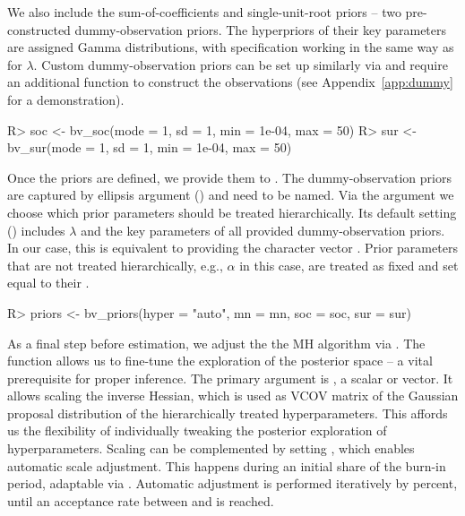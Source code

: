 \documentclass[article,nojss]{jss} %
\begin{document}
We also include the sum-of-coefficients and single-unit-root priors -- two pre-constructed dummy-observation priors. The hyperpriors of their key parameters are assigned Gamma distributions, with specification working in the same way as for $\lambda$. Custom dummy-observation priors can be set up similarly via  and require an additional function to construct the observations (see Appendix~\ref{app:dummy} for a demonstration).

\begin{Schunk}
\begin{Sinput}
R> soc <- bv_soc(mode = 1, sd = 1, min = 1e-04, max = 50)
R> sur <- bv_sur(mode = 1, sd = 1, min = 1e-04, max = 50)
\end{Sinput}
\end{Schunk}

Once the priors are defined, we provide them to . The dummy-observation priors are captured by ellipsis argument () and need to be named. Via the argument  we choose which prior parameters should be treated hierarchically. Its default setting () includes $\lambda$ and the key parameters of all provided dummy-observation priors. In our case, this is equivalent to providing the character vector . Prior parameters that are not treated hierarchically, e.g., $\alpha$ in this case, are treated as fixed and set equal to their .

\begin{Schunk}
\begin{Sinput}
R> priors <- bv_priors(hyper = "auto", mn = mn, soc = soc, sur = sur)
\end{Sinput}
\end{Schunk}

As a final step before estimation, we adjust the the MH algorithm via . The function allows us to fine-tune the exploration of the posterior space -- a vital prerequisite for proper inference.
The primary argument is , a scalar or vector. It allows scaling the inverse Hessian, which is used as VCOV matrix of the Gaussian proposal distribution of the hierarchically treated hyperparameters. This affords us the flexibility of individually tweaking the posterior exploration of hyperparameters.
Scaling can be complemented by setting , which enables automatic scale adjustment. This happens during an initial share of the burn-in period, adaptable via . Automatic adjustment is performed iteratively by  percent, until an acceptance rate between  and  is reached.
\end{document}
